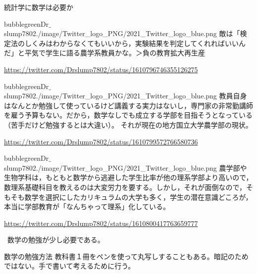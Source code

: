 \begin{SMbox}{統計学に数学は必要か}
    \begin{rightbubbles}{bubblegreen}{Dr$\_$slump7802}{./image/Twitter_logo_PNG/2021_Twitter_logo_blue.png}
        敵は「検定法のしくみはわからなくてもいいから，実験結果を判定してくれればいいんだ」と平気で学生に語る農学系教員かな。＞負の教育拡大再生産
        \begin{flushright} 
                \small	\url{https://twitter.com/Drslump7802/status/1610796746355126275}
            \end{flushright}    
    \end{rightbubbles}

    \begin{rightbubbles}{bubblegreen}{Dr$\_$slump7802}{./image/Twitter_logo_PNG/2021_Twitter_logo_blue.png}
        教員自身はなんとか勉強して使っているけど講義する実力はないし，専門家の非常勤講師を雇う予算もない。だから，数学なしでも成立する学部を目指そうとなっている（苦手だけど勉強するとは大違い）。
        それが現在の地方国立大学農学部の現状。
        \begin{flushright} 
            \small	\url{https://twitter.com/Drslump7802/status/1610799572766580736}
        \end{flushright}    
    \end{rightbubbles}

    \begin{rightbubbles}{bubblegreen}{Dr$\_$slump7802}{./image/Twitter_logo_PNG/2021_Twitter_logo_blue.png}
        農学部や生物学科は，もともと数学から逃避した学生比率が他の理系学部より高いので，数理系基礎科目を教えるのは大変労力を要する。しかし，それが面倒なので，そもそも数学を選択にしたカリキュラムの大学も多く，学生の潜在意識どころが，本当に学部教育が「なんちゃって理系」化している。
        \begin{flushright} 
            \small	\url{https://twitter.com/Drslump7802/status/1610800417763659777}
        \end{flushright}    
    \end{rightbubbles}
\ 
    数学の勉強が少し必要である。
\end{SMbox}

\begin{SMbox}{数学の勉強方法}
    教科書１冊をペンを使って丸写しすることもある。暗記のためではない。手で書いて考えるために行う。
\end{SMbox}
    

